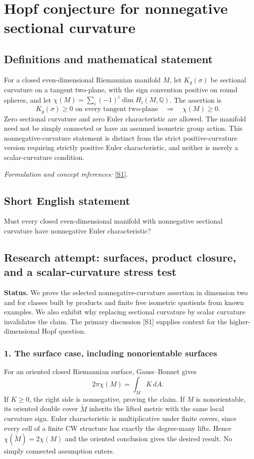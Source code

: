 \documentclass[11pt]{article}
\begin{document}
\section*{\texorpdfstring{Hopf conjecture for nonnegative sectional curvature}{Hopf conjecture for nonnegative sectional curvature}}\label{statement}
\subsection{Definitions and mathematical statement}
For a closed even-dimensional Riemannian manifold $M$, let $K_g(\sigma)$ be sectional curvature on a tangent two-plane, with the sign convention positive on round spheres, and let
$\chi(M)=\sum_i(-1)^i\dim H_i(M,{\mathbb{Q}})$. The assertion is
\[
 K_g(\sigma)\ge0\text{ on every tangent two-plane}
 \quad\Longrightarrow\quad\chi(M)\ge0.
\]
Zero sectional curvature and zero Euler characteristic are allowed. The manifold need not be simply connected or have an assumed isometric group action. This nonnegative-curvature statement is distinct from the strict positive-curvature version requiring strictly positive Euler characteristic, and neither is merely a scalar-curvature condition.
\par\smallskip\textit{Formulation and concept references:} \href{https://link.springer.com/article/10.1365/s13291-020-00225-x}{[S1]}.

\subsection{Short English statement}
Must every closed even-dimensional manifold with nonnegative sectional curvature have nonnegative Euler characteristic?
\subsection{Research attempt: surfaces, product closure, and a scalar-curvature stress test}
\textbf{Status.} We prove the selected nonnegative-curvature assertion in dimension two and for classes built by products and finite free isometric quotients from known examples. We also exhibit why replacing sectional curvature by scalar curvature invalidates the claim. The primary discussion [S1] supplies context for the higher-dimensional Hopf question.

\subsubsection{1. The surface case, including nonorientable surfaces}
For an oriented closed Riemannian surface, Gauss--Bonnet gives
\[2\pi\chi(M)=\int_M K\,dA.\]
If $K\ge0$, the right side is nonnegative, proving the claim. If $M$ is nonorientable, its oriented double cover $\widetilde M$ inherits the lifted metric with the same local curvature sign. Euler characteristic is multiplicative under finite covers, since every cell of a finite CW structure has exactly the degree-many lifts. Hence $\chi(\widetilde M)=2\chi(M)$ and the oriented conclusion gives the desired result. No simply connected assumption enters.
\end{document}
